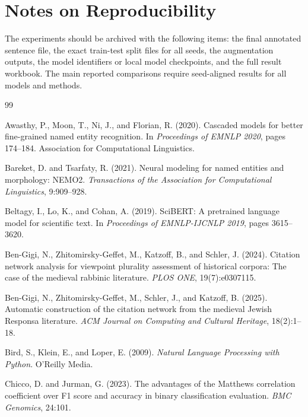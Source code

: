 \documentclass[12pt,a4paper]{report}
\begin{document}
\chapter{Notes on Reproducibility}
The experiments should be archived with the following items: the final annotated sentence file, the exact train-test split files for all seeds, the augmentation outputs, the model identifiers or local model checkpoints, and the full result workbook. The main reported comparisons require seed-aligned results for all models and methods.


\begin{thebibliography}{99}

Awasthy, P., Moon, T., Ni, J., and Florian, R. (2020).
Cascaded models for better fine-grained named entity recognition.
In \emph{Proceedings of EMNLP 2020}, pages 174--184. Association for Computational Linguistics.

Bareket, D. and Tsarfaty, R. (2021).
Neural modeling for named entities and morphology: NEMO2.
\emph{Transactions of the Association for Computational Linguistics}, 9:909--928.

Beltagy, I., Lo, K., and Cohan, A. (2019).
SciBERT: A pretrained language model for scientific text.
In \emph{Proceedings of EMNLP-IJCNLP 2019}, pages 3615--3620.

Ben-Gigi, N., Zhitomirsky-Geffet, M., Katzoff, B., and Schler, J. (2024).
Citation network analysis for viewpoint plurality assessment of historical corpora: The case of the medieval rabbinic literature.
\emph{PLOS ONE}, 19(7):e0307115.

Ben-Gigi, N., Zhitomirsky-Geffet, M., Schler, J., and Katzoff, B. (2025).
Automatic construction of the citation network from the medieval Jewish Responsa literature.
\emph{ACM Journal on Computing and Cultural Heritage}, 18(2):1--18.

Bird, S., Klein, E., and Loper, E. (2009).
\emph{Natural Language Processing with Python}. O'Reilly Media.

Chicco, D. and Jurman, G. (2023).
The advantages of the Matthews correlation coefficient over F1 score and accuracy in binary classification evaluation.
\emph{BMC Genomics}, 24:101.


\end{thebibliography}
\end{document}
